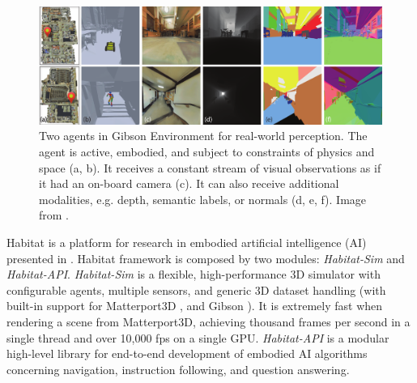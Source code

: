   \begin{figure}[h!]
 	\centering
 	\includegraphics[width=0.99\linewidth]{images/gibson.png}
 	\caption{Two agents in Gibson Environment for real-world perception. The agent is active, embodied, and subject to constraints of physics and space
 		(a, b). It receives a constant stream of visual observations as if it had an on-board camera (c). It can also receive additional modalities, e.g. depth, semantic
 		labels, or normals (d, e, f). Image from \cite{gibson}.}
 \end{figure}
 
 Habitat is a platform for research in embodied artificial intelligence (AI) presented in \cite{habitat}. Habitat framework is composed by two modules: \textit{Habitat-Sim} and \textit{Habitat-API}. \textit{Habitat-Sim} is a flexible, high-performance 3D
 simulator with configurable agents, multiple sensors, and
 generic 3D dataset handling (with built-in support for Matterport3D \cite{matterport}, and Gibson \cite{gibson}). It is extremely fast when rendering a scene from Matterport3D, achieving thousand frames per second in a single thread and over 10,000 fps on a single GPU. \textit{Habitat-API} is a modular high-level library for end-to-end development of embodied AI algorithms concerning navigation, instruction following,
 and question answering.   
 

